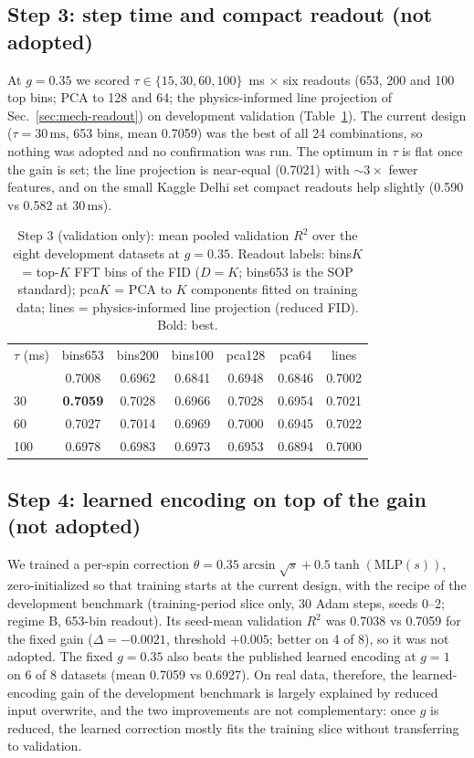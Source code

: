 \documentclass[aps,prresearch,preprint,superscriptaddress,amsmath,amssymb,floatfix]{revtex4-2}
\newcommand{\SI}[2]{\ensuremath{#1\,\mathrm{#2}}}
\begin{document}
\subsection{Step 3: step time and compact readout (not adopted)}
At $g=0.35$ we scored $\tau\in\{15,30,60,100\}$~ms $\times$ six readouts (653, 200 and
100 top bins; PCA to 128 and 64; the physics-informed line projection of
Sec.~\ref{sec:mech-readout}) on development validation (Table~\ref{tab:c5c7}). The
current design ($\tau=\SI{30}{ms}$, 653 bins, mean 0.7059) was the best of all 24
combinations, so nothing was adopted and no confirmation was run. The optimum in
$\tau$ is flat once the gain is set; the line projection is near-equal (0.7021) with
${\sim}3\times$ fewer features, and on the small Kaggle Delhi set compact readouts
help slightly (0.590 vs 0.582 at \SI{30}{ms}).

\begin{table}[t]
\caption{\label{tab:c5c7}Step 3 (validation only): mean pooled validation $R^2$ over the
eight development datasets at $g=0.35$. Readout labels: bins$K$ = top-$K$ FFT bins of
the FID ($D=K$; bins653 is the SOP standard); pca$K$ = PCA to $K$ components fitted on
training data; lines = physics-informed line projection (reduced FID). Bold: best.}
\begin{ruledtabular}
\begin{tabular}{lcccccc}
$\tau$ (ms) & bins653 & bins200 & bins100 & pca128 & pca64 & lines \\ \colrule
15  & 0.7008 & 0.6962 & 0.6841 & 0.6948 & 0.6846 & 0.7002 \\
30  & \textbf{0.7059} & 0.7028 & 0.6966 & 0.7028 & 0.6954 & 0.7021 \\
60  & 0.7027 & 0.7014 & 0.6969 & 0.7000 & 0.6945 & 0.7022 \\
100 & 0.6978 & 0.6983 & 0.6973 & 0.6953 & 0.6894 & 0.7000 \\
\end{tabular}
\end{ruledtabular}
\end{table}

\subsection{Step 4: learned encoding on top of the gain (not adopted)}\label{sec:step4}
We trained a per-spin correction $\theta=0.35\arcsin\sqrt{s}+0.5\tanh(\mathrm{MLP}(s))$,
zero-initialized so that training starts at the current design, with the recipe of the
development benchmark (training-period slice only, 30 Adam steps, seeds 0--2;
regime B, 653-bin readout). Its seed-mean validation $R^2$ was 0.7038 vs 0.7059 for the
fixed gain ($\Delta=-0.0021$, threshold $+0.005$; better on 4 of 8), so it was not
adopted. The fixed $g=0.35$ also beats the published learned encoding at $g=1$ on 6 of
8 datasets (mean 0.7059 vs 0.6927). On real data, therefore, the learned-encoding gain
of the development benchmark is largely explained by reduced input overwrite, and the
two improvements are not complementary: once $g$ is reduced, the learned correction
mostly fits the training slice without transferring to validation.
\end{document}
